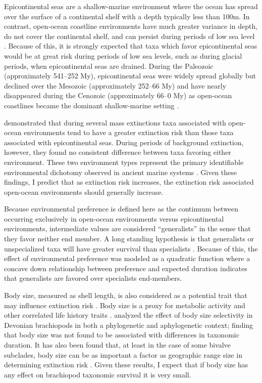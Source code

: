 \documentclass{article}
\begin{document}
Epicontinental seas are a shallow-marine environment where the ocean has spread over the surface of a continental shelf with a depth typically less than 100m. In contrast, open-ocean coastline environments have much greater variance in depth, do not cover the continental shelf, and can persist during periods of low sea level \citep{Miller2009a}. Because of this, it is strongly expected that taxa which favor epicontinental seas would be at great risk during periods of low sea levels, such as during glacial periods, when epicontinental seas are drained. During the Paleozoic (approximately 541--252 My), epicontinental seas were widely spread globally but declined over the Mesozoic (approximately 252--66 My) and have nearly disappeared during the Cenozoic (approximately 66--0 My) as open-ocean coastlines became the dominant shallow-marine setting \citep{Peters2008,Miller2009a,Johnson1974}. 

\citet{Miller2009a} demonstrated that during several mass extinctions taxa associated with open-ocean environments tend to have a greater extinction risk than those taxa associated with epicontinental seas. During periods of background extinction, however, they found no consistent difference between taxa favoring either environment. These two environment types represent the primary identifiable environmental dichotomy observed in ancient marine systems \citep{Miller2009a,Peters2008,Sheehan2001b}. Given these findings, I predict that as extinction risk increases, the extinction risk associated open-ocean environments should generally increase. 

Because environmental preference is defined here as the continuum between occurring exclusively in open-ocean environments versus epicontinental environments, intermediate values are considered ``generalists'' in the sense that they favor neither end member. A long standing hypothesis is that generalists or unspecialized taxa will have greater survival than specialists \citep{Simpson1944,Liow2004a,Liow2007b,Nurnberg2013a,Nurnberg2015,Baumiller1993}. Because of this, the effect of environmental preference was modeled as a quadratic function where a concave down relationship between preference and expected duration indicates that generalists are favored over specialists end-members.

Body size, measured as shell length, is also considered as a potential trait that may influence extinction risk \citep{Payne2014,Harnik2011}. Body size is a proxy for metabolic activity and other correlated life history traits \citep{Payne2014}. \citet{Harnik2014} analyzed the effect of body size selectivity in Devonian brachiopods in both a phylogenetic and aphylogenetic context; finding that body size was not found to be associated with differences in taxonomic duration. It has also been found that, at least in the case of some bivalve subclades, body size can be as important a factor as geographic range size in determining extinction risk \citep{Harnik2011}. Given these results, I expect that if body size has any effect on brachiopod taxonomic survival it is very small.
\end{document}
